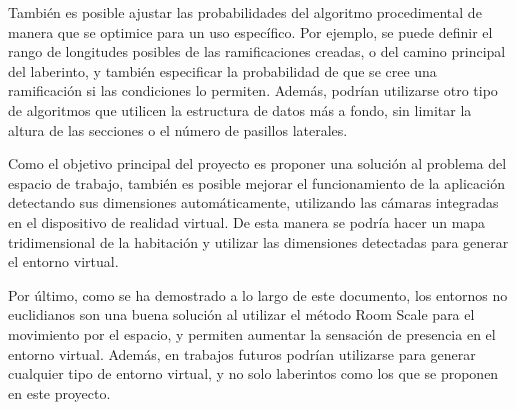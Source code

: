 \documentclass[../main.tex]{subfiles}
\begin{document}
También es posible ajustar las probabilidades del algoritmo procedimental de manera que se optimice para un uso específico. Por ejemplo, se puede definir el rango de longitudes posibles de las ramificaciones creadas, o del camino principal del laberinto, y también especificar la probabilidad de que se cree una ramificación si las condiciones lo permiten. Además, podrían utilizarse otro tipo de algoritmos que utilicen la estructura de datos más a fondo, sin limitar la altura de las secciones o el número de pasillos laterales.

Como el objetivo principal del proyecto es proponer una solución al problema del espacio de trabajo, también es posible mejorar el funcionamiento de la aplicación detectando sus dimensiones automáticamente, utilizando las cámaras integradas en el dispositivo de realidad virtual. De esta manera se podría hacer un mapa tridimensional de la habitación y utilizar las dimensiones detectadas para generar el entorno virtual.

Por último, como se ha demostrado a lo largo de este documento, los entornos no euclidianos son una buena solución al utilizar el método Room Scale para el movimiento por el espacio, y permiten aumentar la sensación de presencia en el entorno virtual. Además, en trabajos futuros podrían utilizarse para generar cualquier tipo de entorno virtual, y no solo laberintos como los que se proponen en este proyecto.
\end{document}
